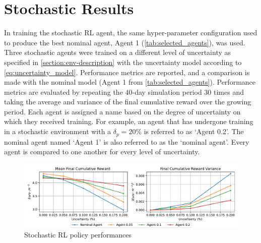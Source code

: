 \section{Stochastic Results} \label{section:rl-stochastic-results}
In training the stochastic RL agent, the same hyper-parameter configuration used to produce the best nominal agent, Agent 1 (\autoref{tab:selected_agents}), was used. Three stochastic agents were trained on a different level of uncertainty as specified in \autoref{section:env-description} with the uncertainty model according to \autoref{eq:uncertainty_model}. Performance metrics are reported, and a comparison is made with the nominal model (Agent 1 from \autoref{tab:selected_agents}). Performance metrics are evaluated by repeating the 40-day simulation period 30 times and taking the average and variance of the final cumulative reward over the growing period. Each agent is assigned a name based on the degree of uncertainty on which they received training. For example, an agent that has undergone training in a stochastic environment with a $\delta_p= 20\%$ is referred to as ‘Agent 0.2’. The nominal agent named ‘Agent 1’ is also referred to as the ‘nominal agent’. Every agent is compared to one another for every level of uncertainty.

\begin{figure}[H]
    \centering
    \includegraphics[width = \textwidth]{figures/stochastic_rl_policies.pdf}
    \caption{Stochastic RL policy performances}
    \label{fig:stochastic-rl-policies}
\end{figure}

